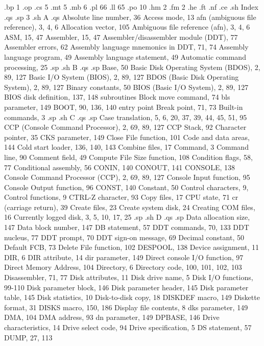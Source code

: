 
.bp 1
.op
.cs 5
.mt 5
.mb 6
.pl 66
.ll 65
.po 10
.hm 2
.fm 2
.he 
.ft
.nf
.ce
.sh
Index
.qs
.sp 3
.sh
A
.qs
Absolute line number, 36
Access mode, 13
afn (ambiguous file 
    reference), 3, 4, 6
Allocation vector, 105
Ambiguous file reference 
    (afn), 3, 4, 6
ASM, 15, 47
Assembler, 15, 47
Assembler/disassembler module 
    (DDT), 77
Assembler errors, 62
Assembly language mnemonics 
    in DDT, 71, 74
Assembly language program, 49
Assembly language statement, 49
Automatic command 
    processing, 25
.sp
.sh
B
.qs
.sp
Base, 50
Basic Disk Operating System 
    (BDOS), 2, 89, 127
Basic I/O System (BIOS), 
    2, 89, 127
BDOS (Basic Disk Operating 
    System), 2, 89, 127
Binary constants, 50
BIOS (Basic I/O System), 
    2, 89, 127
BIOS disk definition, 137,  148
  subroutines
Block move command, 74
bls parameter, 149
BOOT, 90, 136, 140
  entry point
Break point, 71, 73
Built-in commands, 3
.sp
.sh
C
.qs
.sp
Case translation, 5, 6, 20, 
    37, 39, 44, 45, 51, 95
CCP (Console Command 
    Processor), 2, 69, 89, 127
CCP Stack, 92
Character pointer, 35
CKS parameter, 149
Close File function, 101
Code and data areas, 144
Cold start loader, 136, 
    140, 143
Combine files, 17
Command, 3
Command line, 90
Comment field, 49
Compute File Size 
    function, 108
Condition flags, 58, 77
Conditional assembly, 56
CONIN, 140
CONOUT, 141
CONSOLE, 138
Console Command Processor 
    (CCP), 2, 69, 89, 127
Console Input function, 95
Console Output function, 96
CONST, 140
Constant, 50
Control characters, 9, 
Control functions, 9
CTRL-Z character, 93
Copy files, 17
CPU state, 71
cr (carriage return), 39
Create files, 23
Create system disk, 24
Creating COM files, 16
Currently logged disk, 
    3, 5, 10, 17, 25
.sp
.sh
D
.qs
.sp
Data allocation size, 147
Data block number, 147
DB statement, 57
DDT commands, 70, 133
DDT nucleus, 77
DDT prompt, 70
DDT sign-on message, 69
Decimal constant, 50
Default FCB, 73
Delete File function, 102
DESPOOL, 138
Device assignment, 11
DIR, 6
DIR attribute, 14
dir parameter, 149
Direct console I/O 
    function, 97
Direct Memory Address, 104
Directory, 6
Directory code, 100, 101, 
    102, 103
Disassembler, 71, 77
Disk attributes, 11
Disk drive name, 5
Disk I/O functions, 99-110
Disk parameter block, 146
Disk parameter header, 145
Disk parameter table, 145
Disk statistics, 10
Disk-to-disk copy, 18
DISKDEF macro, 149
Diskette format, 31
DISKS macro, 150, 186
Display file contents, 8
dks parameter, 149
DMA, 104
DMA address, 93
dn parameter, 149
DPBASE, 146
Drive characteristics, 14
Drive select code, 94
Drive specification, 5
DS statement, 57
DUMP, 27, 113
